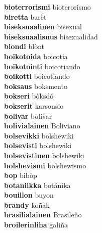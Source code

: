 \textbf{bioterrorismi } bioterorismo \\
\textbf{biretta } barèt \\
\textbf{biseksuaalinen } bisexual \\
\textbf{biseksuaalisuus } bisexualidad \\
\textbf{blondi } blònt \\
\textbf{boikotoida } boicotia \\
\textbf{boikotointi } boicotiando \\
\textbf{boikotti } boicotiando \\
\textbf{boksaus } boksmento \\
\textbf{bokseri } bòksdó \\
\textbf{bokserit } karsonsio \\
\textbf{bolivar } bolívar \\
\textbf{bolivialainen } Boliviano \\
\textbf{bolsevikki } bolshewiki \\
\textbf{bolsevisti } bolshewiki \\
\textbf{bolsevistinen } bolshewiki \\
\textbf{bolshevismi } bolshewismo \\
\textbf{bop } bibòp \\
\textbf{botaniikka } botánika \\
\textbf{bouillon } buyon \\
\textbf{brandy } koñak \\
\textbf{brasilialainen } Brasileño \\
\textbf{broilerinliha } galiña \\
